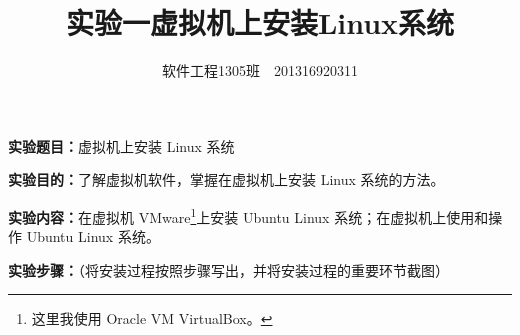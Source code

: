 \documentclass[cs4size,a4paper,nofonts]{ctexart}
\def\tjf{{\tt{田劲锋}}}
\def\titlec{实验一\quad 虚拟机上安装Linux系统}
\begin{document}

\title{\bf\titlec}
\author{软件工程1305班~\quad\tjf\quad~201316920311}
\maketitle

{\bf 实验题目：}虚拟机上安装 Linux 系统

{\bf 实验目的：}了解虚拟机软件，掌握在虚拟机上安装 Linux 系统的方法。

{\bf 实验内容：}在虚拟机 VMware\footnote{这里我使用 Oracle VM VirtualBox。}上安装 Ubuntu Linux 系统；在虚拟机上使用和操作 Ubuntu Linux 系统。

{\bf 实验步骤：}（将安装过程按照步骤写出，并将安装过程的重要环节截图）

\newcommand{\image}[2]{\begin{minipage}[t]{0.5\textwidth}
\centering
\texttt{[image: images/\#1.png]}
\caption{#2}
\label{fig:#2}
\end{minipage}}
\end{document}
